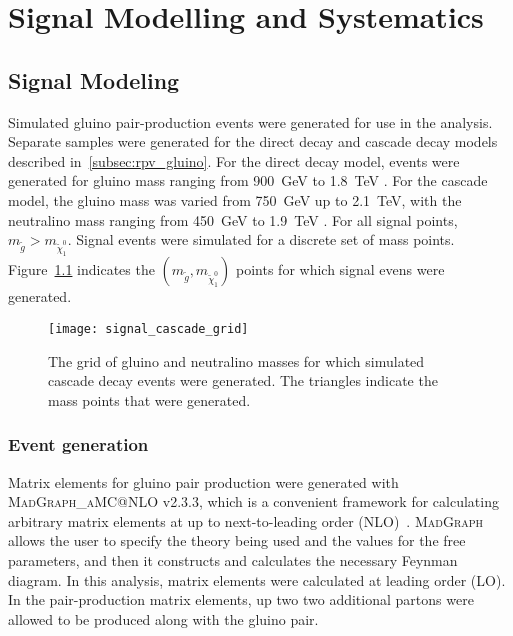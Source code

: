 \chapter{Signal Modelling and Systematics} \label{ch:signal}

\section{Signal Modeling}\label{sec:signal_modeling}

Simulated gluino pair-production events were generated for use in the analysis.
Separate samples were generated for the direct decay and cascade decay models described in~\ref{subsec:rpv_gluino}.
For the direct decay model, events were generated for gluino mass ranging from 900~GeV to 1.8~TeV .
For the cascade model, the gluino mass was varied from 750~GeV up to 2.1~TeV, with the neutralino mass ranging from
450~GeV to 1.9~TeV .
For all signal points, $m_{\tilde{g}} > m_{\tilde{\chi}_1^0}$.
Signal events were simulated for a discrete set of mass points.
Figure~\ref{fig:signal_cascade_grid} indicates the $\left(m_{\tilde{g}}, m_{\tilde{\chi}_1^0}\right)$ points for which
signal evens were generated.

\begin{figure}[!ht]
    \centering
\texttt{[image: signal\_cascade\_grid]}
\caption{The grid of gluino and neutralino masses for which simulated cascade decay events were generated. The triangles
indicate the mass points that were generated.}
\label{fig:signal_cascade_grid}
\end{figure}

\subsection{Event generation}\label{subsec:signal_event_gen}

Matrix elements for gluino pair production were generated with \textsc{MadGraph\_aMC@NLO} v2.3.3,
which is a convenient framework for calculating arbitrary matrix elements at up to next-to-leading order (NLO)~\cite{signal-madgraph}.
\textsc{MadGraph} allows the user to specify the theory being used and the values for the free parameters,
and then it constructs and calculates the necessary Feynman diagram.
In this analysis, matrix elements were calculated at leading order (LO).
In the pair-production matrix elements, up two two additional partons were allowed to be produced along with the
gluino pair.

